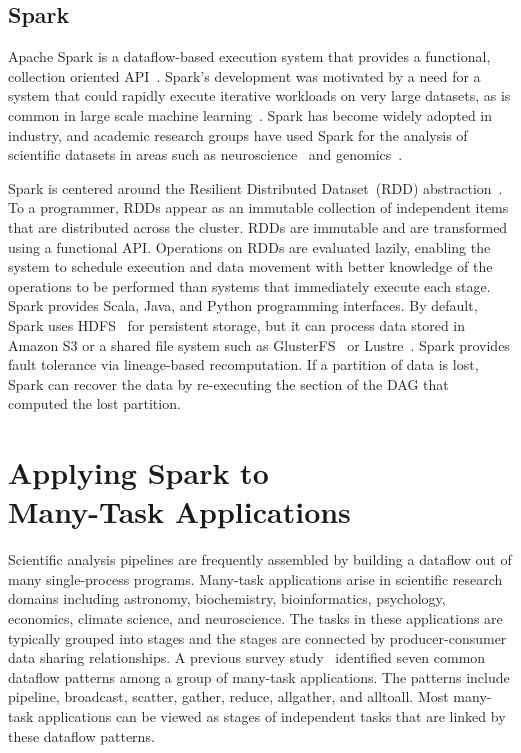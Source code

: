 \documentclass[10pt,journal,compsoc]{IEEEtran}
\begin{document}
\subsection{Spark}
Apache Spark is a dataflow-based execution system that provides a functional, collection
oriented API~\cite{zaharia12}. Spark's development was motivated by a need for a
system that could rapidly execute iterative workloads on very large datasets, as is common
in large scale machine learning~\cite{zaharia10}. Spark has
become widely adopted in industry, and academic research groups have used Spark
for the analysis of scientific datasets in areas such as neuroscience~\cite{freeman14} and genomics~\cite{nothaft15}.

Spark is centered around the Resilient Distributed Dataset~(RDD) abstraction~\cite{zaharia12}.
To a programmer, RDDs appear as an immutable collection of independent items that are 
distributed across the cluster. RDDs are immutable and are transformed using a
functional API. Operations on RDDs are evaluated lazily, enabling the system to schedule 
execution and data movement with better knowledge of the operations to be performed than 
systems that immediately execute each stage. Spark provides Scala, Java, and Python programming interfaces.
By default, Spark uses HDFS~\cite{shvachko10} for persistent storage, but
it can process data stored in Amazon S3 or a shared file system such as
GlusterFS~\cite{davies13} or Lustre~\cite{donovan03}. Spark provides fault tolerance via
lineage-based recomputation. If a partition of data is lost, Spark can recover the data
by re-executing the section of the DAG that computed the lost partition.


\section{Applying Spark to \\ Many-Task Applications}
\label{sec:Capability}

Scientific analysis pipelines are frequently assembled by building a dataflow out of many
single-process programs. Many-task applications arise in scientific research
domains including astronomy, biochemistry, bioinformatics, psychology, economics, climate science,
and neuroscience. The tasks in these applications are typically grouped into stages and the stages are connected by
producer-consumer data sharing relationships. 
A previous survey study~\cite{katz11} identified
seven common dataflow patterns among a group of many-task applications. The patterns
include pipeline, broadcast, scatter, gather,
reduce, allgather, and alltoall. Most many-task applications
can be viewed as stages of independent tasks that are linked by these dataflow patterns.
\end{document}
